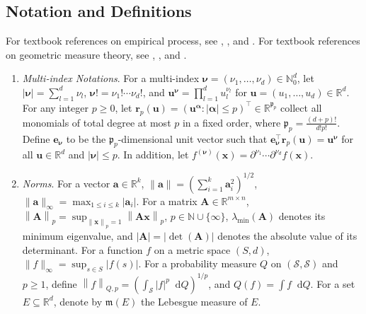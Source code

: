 \documentclass[10pt]{article}
\newcommand{\reals}{\mathbb{R}}
\newcommand{\dif}{\mathop{}\!\mathrm{d}}
\newcommand{\norm}[1]{\left\lVert#1\right\rVert}
\newcommand{\infnorm}[1]{\lVert #1 \rVert_{\infty}}
\newcommand{\ba}{\mathbf{a}}
\newcommand{\bA}{\mathbf{A}}
\newcommand{\be}{\mathbf{e}}
\newcommand{\br}{\mathbf{r}}
\newcommand{\bu}{\mathbf{u}}
\newcommand{\bx}{\mathbf{x}}
\newcommand{\bnu}{\boldsymbol{\nu}}
\begin{document}
\subsection{Notation and Definitions}

For textbook references on empirical process, see \cite{van-der-Vaart-Wellner_1996_Book}, \cite{dudley2014uniform}, and \cite{Gine-Nickl_2016_Book}. For textbook references on geometric measure theory, see \cite{simon1984lectures}, \cite{federer2014geometric}, and \cite{folland2002advanced}.

\begin{enumerate}[label=(\roman*)]
    \item \textit{Multi-index Notations}. For a multi-index $\bnu = (\nu_1, \ldots, \nu_d) \in \mathbb{N}_0^d$, let $|\bnu| = \sum_{l = 1}^d \nu_l$, $\bnu! = \nu_1!\cdots \nu_d!$, and $\bu^{\bnu} = \prod_{l=1}^d u_l^{\nu_l}$ for $\bu=(u_1,\ldots,u_d)\in\mathbb{R}^d$. For any integer $p\geq0$, let $\br_p(\bu) = (\bu^{\boldsymbol{\alpha}}: |\boldsymbol{\alpha}|\leq p)^\top \in \mathbb{R}^{\mathfrak{p}_p}$ collect all monomials of total degree at most $p$ in a fixed order, where $\mathfrak{p}_p = \frac{(d + p)!}{d! p !}$. Define $\be_{\bnu}$ to be the $\mathfrak{p}_p$-dimensional unit vector such that $\be_{\bnu}^{\top} \br_p(\bu) = \bu^{\bnu}$ for all $\bu \in \reals^d$ and $|\bnu|\leq p$. In addition, let $f^{(\bnu)}(\bx) = \partial^{\nu_1}\cdots\partial^{\nu_d} f(\bx)$.

    \item \textit{Norms}. For a vector $\ba \in \reals^k$, $\norm{\ba} = (\sum_{i = 1}^k \ba_i^2)^{1/2}$, $\infnorm{\ba} = \max_{1 \leq i \leq k}|\ba_i|$. For a matrix $\bA \in \reals^{m \times n}$, $\norm{\bA}_p = \sup_{\norm{\bx}_p = 1} \norm{\bA\bx}_p$, $p \in \mathbb{N} \cup \{\infty\}$, $\lambda_{\min}(\bA)$ denotes its minimum eigenvalue, and $|\bA|=|\det(\bA)|$ denotes the absolute value of its determinant. For a function $f$ on a metric space $(S, d)$, $\infnorm{f} = \sup_{s \in S} |f(s)|$. For a probability measure $Q$ on $(\mathcal{S}, \mathscr{S})$ and $p \geq 1$, define $\norm{f}_{Q,p} = (\int_{\mathcal{S}} |f|^p \dif Q)^{1/p}$, and $Q(f) = \int f \dif Q$. For a set $E \subseteq \reals^d$, denote by $\mathfrak{m}(E)$ the Lebesgue measure of $E$.


\end{enumerate}
\end{document}
